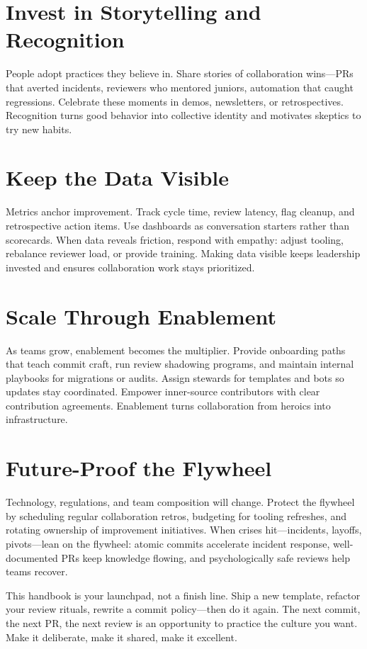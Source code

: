 \documentclass[11pt,openany]{book}
\begin{document}
\section*{Invest in Storytelling and Recognition}
People adopt practices they believe in. Share stories of collaboration wins---PRs that averted incidents, reviewers who mentored juniors, automation that caught regressions. Celebrate these moments in demos, newsletters, or retrospectives. Recognition turns good behavior into collective identity and motivates skeptics to try new habits.

\section*{Keep the Data Visible}
Metrics anchor improvement. Track cycle time, review latency, flag cleanup, and retrospective action items. Use dashboards as conversation starters rather than scorecards. When data reveals friction, respond with empathy: adjust tooling, rebalance reviewer load, or provide training. Making data visible keeps leadership invested and ensures collaboration work stays prioritized.

\section*{Scale Through Enablement}
As teams grow, enablement becomes the multiplier. Provide onboarding paths that teach commit craft, run review shadowing programs, and maintain internal playbooks for migrations or audits. Assign stewards for templates and bots so updates stay coordinated. Empower inner-source contributors with clear contribution agreements. Enablement turns collaboration from heroics into infrastructure.

\section*{Future-Proof the Flywheel}
Technology, regulations, and team composition will change. Protect the flywheel by scheduling regular collaboration retros, budgeting for tooling refreshes, and rotating ownership of improvement initiatives. When crises hit---incidents, layoffs, pivots---lean on the flywheel: atomic commits accelerate incident response, well-documented PRs keep knowledge flowing, and psychologically safe reviews help teams recover.

This handbook is your launchpad, not a finish line. Ship a new template, refactor your review rituals, rewrite a commit policy---then do it again. The next commit, the next PR, the next review is an opportunity to practice the culture you want. Make it deliberate, make it shared, make it excellent.
\end{document}
